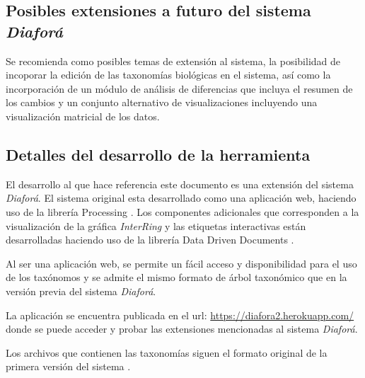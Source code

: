 \documentclass[journal]{IEEEtran}
\begin{document}
\subsection{Posibles extensiones a futuro del sistema \emph{Diaforá}}

Se recomienda como posibles temas de extensión al sistema, la posibilidad de incoporar la edición 
de las taxonomías biológicas en el sistema, así como la incorporación de un módulo de análisis de diferencias
que incluya el resumen de los cambios y un conjunto alternativo de visualizaciones incluyendo una visualización matricial
de los datos.

\subsection{Detalles del desarrollo de la herramienta}
El desarrollo al que hace referencia este documento es una extensión del sistema \emph{Diaforá}\cite{sancho_diafora}.
El sistema original esta desarrollado como una aplicación web, 
haciendo uso de la librería Processing \cite{p5js2020}.
Los componentes adicionales que corresponden a la visualización de la gráfica \emph{InterRing} y las etiquetas
interactivas están desarrolladas haciendo uso de la librería Data Driven Documents \cite{DDD}.

Al ser una aplicación web, se permite un fácil acceso y disponibilidad para el uso de los taxónomos y se admite el 
mismo formato de árbol taxonómico que en la versión previa del sistema \emph{Diaforá}.

La aplicación se encuentra publicada en el url: \url{https://diafora2.herokuapp.com/} donde se puede acceder y probar las extensiones
mencionadas al sistema \emph{Diaforá}.

Los archivos que contienen las taxonomías siguen el formato original de la primera versión del sistema \cite{sancho_diafora}. \\
\end{document}
